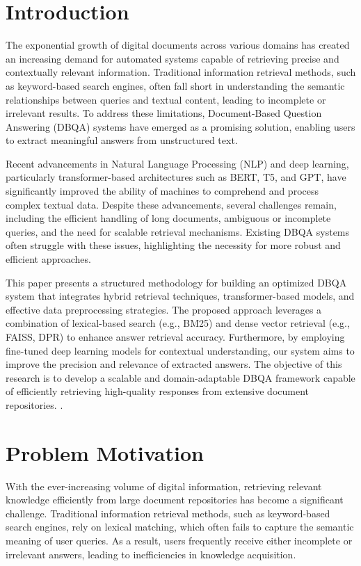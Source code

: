\documentclass[sigconf]{acmart}
\begin{document}
\maketitle

\section{Introduction}
The exponential growth of digital documents across various domains has created an increasing demand for automated systems capable of retrieving precise and contextually relevant information. Traditional information retrieval methods, such as keyword-based search engines, often fall short in understanding the semantic relationships between queries and textual content, leading to incomplete or irrelevant results. To address these limitations, Document-Based Question Answering (DBQA) systems have emerged as a promising solution, enabling users to extract meaningful answers from unstructured text.

Recent advancements in Natural Language Processing (NLP) and deep learning, particularly transformer-based architectures such as BERT, T5, and GPT, have significantly improved the ability of machines to comprehend and process complex textual data. Despite these advancements, several challenges remain, including the efficient handling of long documents, ambiguous or incomplete queries, and the need for scalable retrieval mechanisms. Existing DBQA systems often struggle with these issues, highlighting the necessity for more robust and efficient approaches.

This paper presents a structured methodology for building an optimized DBQA system that integrates hybrid retrieval techniques, transformer-based models, and effective data preprocessing strategies. The proposed approach leverages a combination of lexical-based search (e.g., BM25) and dense vector retrieval (e.g., FAISS, DPR) to enhance answer retrieval accuracy. Furthermore, by employing fine-tuned deep learning models for contextual understanding, our system aims to improve the precision and relevance of extracted answers. The objective of this research is to develop a scalable and domain-adaptable DBQA framework capable of efficiently retrieving high-quality responses from extensive document repositories.
.

\section{Problem Motivation}
With the ever-increasing volume of digital information, retrieving relevant knowledge efficiently from large document repositories has become a significant challenge. Traditional information retrieval methods, such as keyword-based search engines, rely on lexical matching, which often fails to capture the semantic meaning of user queries. As a result, users frequently receive either incomplete or irrelevant answers, leading to inefficiencies in knowledge acquisition.
\end{document}
